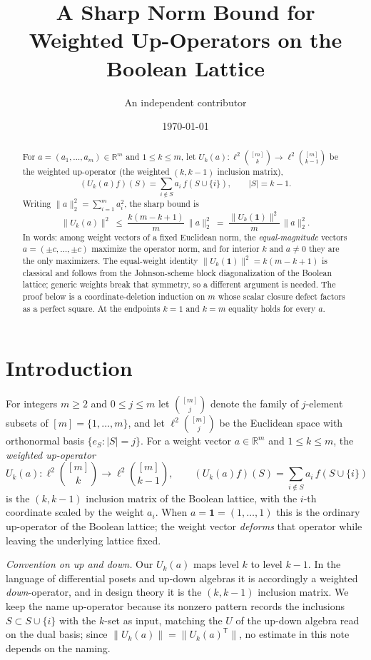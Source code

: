 \documentclass[11pt]{article}
\title{A Sharp Norm Bound for Weighted Up-Operators on the Boolean Lattice}
\author{An independent contributor}
\date{\today}
\theoremstyle{remark}
\begin{document}
\maketitle

\begin{abstract}
For $a=(a_1,\dots,a_m)\in\mathbb{R}^m$ and $1\le k\le m$, let
$U_k(a):\ell^2\binom{[m]}{k}\to\ell^2\binom{[m]}{k-1}$ be the weighted
up-operator (the weighted $(k,k-1)$ inclusion matrix),
\[
(U_k(a)f)(S)=\sum_{i\notin S} a_i\, f(S\cup\{i\}),\qquad |S|=k-1 .
\]
Writing $\|a\|_2^2=\sum_{i=1}^m a_i^2$, the sharp bound is
\[
\|U_k(a)\|^2\;\le\;\frac{k(m-k+1)}{m}\,\|a\|_2^2
\;=\;\frac{\|U_k(\mathbf 1)\|^2}{m}\,\|a\|_2^2 .
\]
In words: among weight vectors of a fixed Euclidean norm, the
\emph{equal-magnitude} vectors $a=(\pm c,\dots,\pm c)$ maximize the
operator norm, and for interior $k$ and $a\ne0$ they are the only
maximizers. The equal-weight identity $\|U_k(\mathbf 1)\|^2=k(m-k+1)$ is
classical and follows from the Johnson-scheme block diagonalization of
the Boolean lattice; generic weights break that symmetry, so a different
argument is needed. The proof below is a coordinate-deletion induction
on $m$ whose scalar closure defect factors as a perfect square. At the
endpoints $k=1$ and $k=m$ equality holds for every $a$.
\end{abstract}

\section{Introduction}

For integers $m\ge 2$ and $0\le j\le m$ let $\binom{[m]}{j}$ denote the
family of $j$-element subsets of $[m]=\{1,\dots,m\}$, and let
$\ell^2\binom{[m]}{j}$ be the Euclidean space with orthonormal basis
$\{e_S:|S|=j\}$. For a weight vector $a\in\mathbb{R}^m$ and
$1\le k\le m$, the \emph{weighted up-operator}
\[
U_k(a):\ell^2\binom{[m]}{k}\to\ell^2\binom{[m]}{k-1},
\qquad
(U_k(a)f)(S)=\sum_{i\notin S} a_i\, f(S\cup\{i\})
\]
is the $(k,k-1)$ inclusion matrix of the Boolean lattice, with the $i$-th
coordinate scaled by the weight $a_i$. When $a=\mathbf 1=(1,\dots,1)$ this
is the ordinary up-operator of the Boolean lattice; the weight vector
\emph{deforms} that operator while leaving the underlying lattice fixed.

\emph{Convention on up and down.} Our $U_k(a)$ maps level $k$ to level
$k-1$. In the language of differential posets and up-down algebras it is
accordingly a weighted \emph{down}-operator, and in design theory it is
the $(k,k-1)$ inclusion matrix. We keep the name up-operator because its
nonzero pattern records the inclusions $S\subset S\cup\{i\}$ with the
$k$-set as input, matching the $U$ of the up-down algebra read on the
dual basis; since $\|U_k(a)\|=\|U_k(a)^{\mathsf T}\|$, no estimate in
this note depends on the naming.
\end{document}
